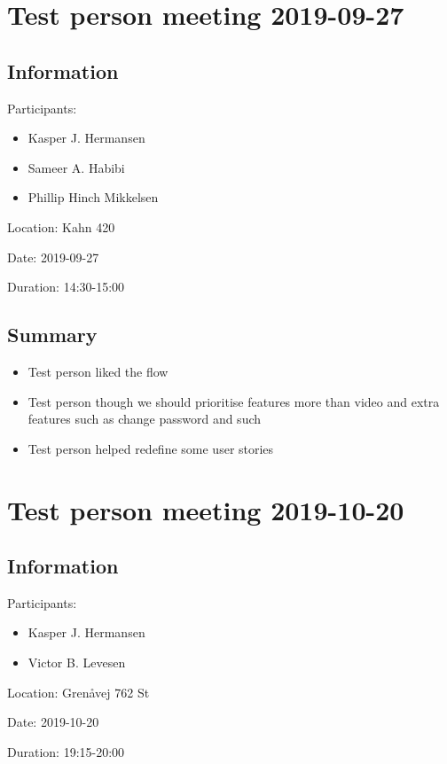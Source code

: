 \newpage
\section{Test person meeting 2019-09-27}

\subsection{Information}
Participants:
\begin{itemize}
    \item Kasper J. Hermansen
    \item Sameer A. Habibi
    \item Phillip Hinch Mikkelsen
\end{itemize}

Location:
Kahn 420

Date:
2019-09-27

Duration:
14:30-15:00

\subsection{Summary}

\begin{itemize}
    \item Test person liked the flow
    \item Test person though we should prioritise features more than video and extra features such as change password and such
    \item Test person helped redefine some user stories
\end{itemize}


\newpage
\section{Test person meeting 2019-10-20}

\subsection{Information}
Participants:
\begin{itemize}
    \item Kasper J. Hermansen
    \item Victor B. Levesen
\end{itemize}

Location:
Grenåvej 762 St

Date:
2019-10-20

Duration:
19:15-20:00

